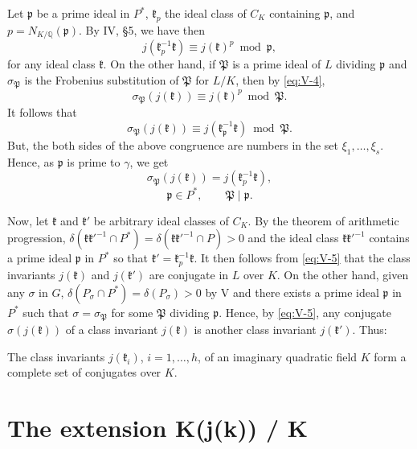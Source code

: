Let $\mathfrak{p}$ be a prime ideal in $P^{*}$, $\mathfrak{k}_{p}$ the
ideal class of $C_{K}$ containing $\mathfrak{p}$, and
$p=N_{K/\mathbb{Q}}(\mathfrak{p})$. By IV, §5, we have then
\[
j(\mathfrak{k}_{p}^{-1}\mathfrak{k})\equiv j(\mathfrak{k})^{p}
\bmod\mathfrak{p},
\]
for any ideal class $\mathfrak{k}$. On the other hand, if $\mathfrak{P}$
is a prime ideal of $L$ dividing $\mathfrak{p}$ and $\sigma_{\mathfrak{P}}$
is the Frobenius substitution of $\mathfrak{P}$ for $L/K$, then by
\eqref{eq:V-4},
\[
\sigma_{\mathfrak{P}}(j(\mathfrak{k}))\equiv j(\mathfrak{k})^{p}
\bmod\mathfrak{P}.
\]
It follows that
\[
\sigma_{\mathfrak{P}}(j(\mathfrak{k}))
\equiv j(\mathfrak{k}_{\mathfrak{p}}^{-1}\mathfrak{k})
\bmod\mathfrak{P}.
\]
But, the both sides of the above congruence are numbers in the set
$\xi_{1},\ldots,\xi_{s}$. Hence, as $\mathfrak{p}$ is prime to $\gamma$,
we get
\[
\sigma_{\mathfrak{P}}(j(\mathfrak{k}))
=j(\mathfrak{k}_{p}^{-1}\mathfrak{k}),
\tag{5}\label{eq:V-5}
\]
\[
\mathfrak{p}\in P^{*},\qquad\mathfrak{P}\mid\mathfrak{p}.
\]

Now, let $\mathfrak{k}$ and $\mathfrak{k}'$ be arbitrary ideal classes of
$C_{K}$. By the theorem of arithmetic progression,
$\delta(\mathfrak{k}\mathfrak{k}'^{-1}\cap P^{*})
=\delta(\mathfrak{k}\mathfrak{k}'^{-1}\cap P)>0$ and the ideal class
$\mathfrak{k}\mathfrak{k}'^{-1}$ contains a prime ideal $\mathfrak{p}$ in
$P^{*}$ so that $\mathfrak{k}'=\mathfrak{k}_{p}^{-1}\mathfrak{k}$. It then
follows from \eqref{eq:V-5} that the class invariants $j(\mathfrak{k})$
and $j(\mathfrak{k}')$ are conjugate in $L$ over $K$. On the other hand,
given any $\sigma$ in $G$, $\delta(P_{\sigma}\cap P^{*})
=\delta(P_{\sigma})>0$ by V and there exists a prime ideal
$\mathfrak{p}$ in $P^{*}$ such that $\sigma=\sigma_{\mathfrak{P}}$ for
some $\mathfrak{P}$ dividing $\mathfrak{p}$. Hence, by \eqref{eq:V-5},
any conjugate $\sigma(j(\mathfrak{k}))$ of a class invariant
$j(\mathfrak{k})$ is another class invariant $j(\mathfrak{k}')$. Thus:

\setcounter{theorem}{0}
\begin{theorem}\label{thm:V-1}
The class invariants $j(\mathfrak{k}_{i})$, $i=1,\ldots,h$, of an
imaginary quadratic field $K$ form a complete set of conjugates over $K$.
\end{theorem}

\section{The extension K(j(k)) / K}\label{sec:V-extension}

